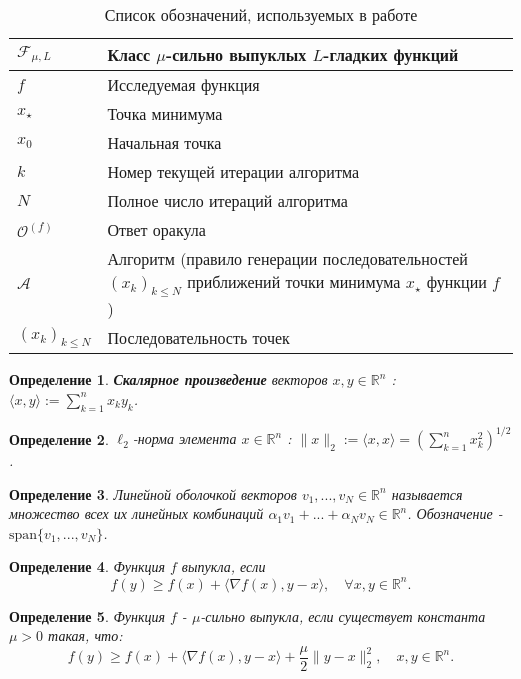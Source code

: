 \documentclass{article}
\newcommand{\R}{\mathbb{R}}
\newtheorem{Def}{Определение}[section]
\begin{document}
\begin{table}[h!]
\caption{Список обозначений, используемых в работе}
\centering
 \begin{tabular}{||p{2 cm} | p{8cm}||} 
 \hline

 $\mathcal{F}_{\mu, L}$ & Класс $\mu$-сильно выпуклых $L$-гладких функций  \\ 
 \hline
 $f$ & Исследуемая функция  \\
 \hline
 $x_{\star}$ & Точка минимума  \\
 \hline
 $x_0$ & Начальная точка  \\
 \hline
 $k$ & Номер текущей итерации алгоритма  \\
 \hline
 $N$ & Полное число итераций алгоритма \\
 \hline
 $\mathcal{O}^{(f)}$ & Ответ оракула  \\ 
 \hline
 $\mathcal{A}$ & Алгоритм (правило генерации последовательностей $(x_k)_{k \le N}$ приближений точки минимума $x_{\star}$ функции $f$) \\
 \hline
 $(x_k)_{k \le N}$ & Последовательность точек  \\[1ex] 
 \hline
 \end{tabular}
\end{table}


\begin{Def}
\textbf{Скалярное произведение} векторов $x,y \in \R^n$ : $\langle x,y \rangle := \sum\limits_{k=1}^n x_ky_k$.
\end{Def}

\begin{Def}
$\ell_2$-норма элемента $x \in \R^n$ : $\|x\|_2 := \langle x, x \rangle 
 = \left(\sum\limits_{k=1}^n x_k^2\right)^{1/2}$.
\end{Def}

\begin{Def}
Линейной оболочкой векторов $v_1, ..., v_N \in \mathbb{R}^n$ называется множество всех их линейных комбинаций $\alpha_1 v_1 + ... + \alpha_N v_N \in \mathbb{R}^n$. Обозначение - $\text{span}\{v_1, ..., v_N\}$.
\end{Def}

\begin{Def}
Функция $f$ выпукла, если 
\begin{equation}
    f(y) \geq f(x)+\langle\nabla f(x), y-x\rangle, \quad \forall x, y \in \mathbb{R}^n.
\end{equation}
\end{Def}

\begin{Def}
Функция $f$ - $\mu$-сильно выпукла, если существует константа $\mu > 0$ такая, что:
    \begin{equation}\label{eq:str_cvx}
        f(y) \geq f(x) + \langle \nabla f(x), y - x \rangle + \frac{\mu}{2}\|y - x\|_2^2, \quad x, y \in \R^n. 
    \end{equation}
\end{Def}
\end{document}
